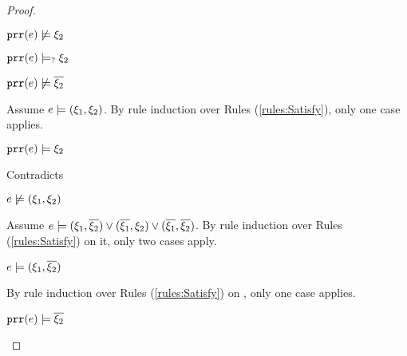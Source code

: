 \begin{proof}
\begin{byCases}
\begin{byCases}
\begin{byCases}
\begin{pfsteps*}
            \item $\mathtt{prr}(e) \not\models \xi_2$  
            \item $\mathtt{prr}(e) \models_{?} \xi_2$  
            \item $\mathtt{prr}(e) \not\models \overline{\xi_2}$  
            \end{pfsteps*}
            Assume $e \models (\xi_1 , \xi_2)$. By rule induction over Rules (\ref{rules:Satisfy}), only one case applies.
            \begin{byCases}
            \item[\text{(\ref{rule:CSNotValPair})}]
                \begin{pfsteps*}
                \item $\mathtt{prr}(e) \models \xi_2$ 
                \end{pfsteps*}
                Contradicts 
            \end{byCases}
            \begin{pfsteps*}
            \item $e \not\models (\xi_1 , \xi_2)$  
            \end{pfsteps*}
            Assume $e \models (\xi_1 , \overline{\xi_2}) \vee (\overline{\xi_1} , \xi_2) \vee (\overline{\xi_1} , \overline{\xi_2})$. By rule induction over Rules (\ref{rules:Satisfy}) on it, only two cases apply.
            \begin{byCases}
            \item[\text{(\ref{rule:CSOr1})}]
                \begin{pfsteps*}
                \item $e \models (\xi_1 , \overline{\xi_2})$  
                \end{pfsteps*}
                By rule induction over Rules (\ref{rules:Satisfy}) on , only one case applies.
                \begin{byCases}
                \item[\text{(\ref{rule:CSNotValPair})}]
                    \begin{pfsteps*}
                    \item $\mathtt{prr}(e) \models \overline{\xi_2}$ 

\end{pfsteps*}
\end{byCases}
\end{byCases}
\end{byCases}
\end{byCases}
\end{byCases}
\end{proof}
